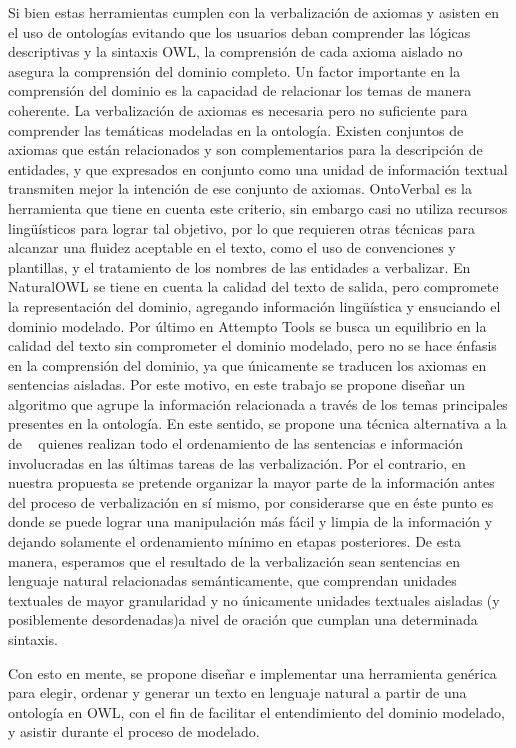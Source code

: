 Si bien estas herramientas cumplen con la verbalización de axiomas y asisten en el uso de ontologías evitando que los usuarios deban comprender las lógicas descriptivas y la sintaxis OWL, la comprensión de cada axioma aislado no asegura la comprensión del dominio completo. Un factor importante en la comprensión del dominio es la capacidad de relacionar los temas de manera coherente. La verbalización de axiomas es necesaria pero no suficiente para comprender las temáticas modeladas en la ontología. Existen conjuntos de axiomas que están relacionados y son complementarios para la descripción de entidades, y que expresados en conjunto como una unidad de información textual transmiten mejor la intención de ese conjunto de axiomas. OntoVerbal es la herramienta que tiene en cuenta este criterio, sin embargo casi no utiliza recursos lingüísticos para lograr tal objetivo, por lo que requieren otras técnicas para alcanzar una fluidez aceptable en el texto, como el uso de convenciones y plantillas, y el tratamiento de los nombres de las entidades a verbalizar. 
En NaturalOWL se tiene en cuenta la calidad del texto de salida, pero compromete la representación del dominio, agregando información lingüística y ensuciando el dominio modelado. Por último en Attempto Tools se busca un equilibrio en la calidad del texto sin comprometer el dominio modelado, pero no se hace énfasis en la comprensión del dominio, ya que únicamente se traducen los axiomas en sentencias aisladas. Por este motivo, en este trabajo se propone diseñar un algoritmo que agrupe la información relacionada a través de los temas principales presentes en la ontología. En este sentido, se propone una técnica alternativa a la de ~\cite{reiter1997building} quienes realizan todo el ordenamiento de las sentencias e información involucradas en las últimas tareas de las verbalización. Por el contrario, en nuestra propuesta se pretende organizar la mayor parte de la información antes del proceso de verbalización en sí mismo, por considerarse que en éste punto es donde se puede lograr una manipulación más fácil y limpia de la información y dejando solamente el ordenamiento mínimo en etapas posteriores. De esta manera, esperamos que el resultado de la verbalización sean sentencias en lenguaje natural relacionadas semánticamente, que comprendan unidades textuales de mayor granularidad y no únicamente unidades textuales  aisladas (y posiblemente desordenadas)a nivel de oración  que cumplan una determinada sintaxis.

Con esto en mente, se propone diseñar e implementar una herramienta genérica para elegir, ordenar y generar un texto en lenguaje natural a partir de una ontología en OWL, con el fin de facilitar el entendimiento del dominio modelado, y asistir durante el proceso de modelado. %



